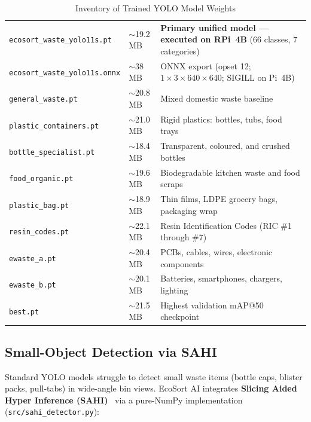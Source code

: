 \documentclass[12pt,a4paper]{article}
\begin{document}
\renewcommand{\arraystretch}{1.30}
\begin{table}[H]
\centering
\caption{Inventory of Trained YOLO Model Weights}
\label{tab:models}
\small
\begin{tabularx}{\linewidth}{@{} L{5.7cm} C{1.7cm} X @{}}
\toprule
{} &  &  \\
\midrule
{}
{\footnotesize\texttt{ecosort\_waste\_yolo11s.pt}}   & $\sim$19.2\,MB & \textbf{Primary unified model --- executed on RPi~4B} (66 classes, 7 categories) \\
{\footnotesize\texttt{ecosort\_waste\_yolo11s.onnx}} & $\sim$38\,MB   & ONNX export (opset 12; $1\times3\times640\times640$; SIGILL on Pi~4B) \\
\texttt{general\_waste.pt}          & $\sim$20.8\,MB & Mixed domestic waste baseline \\
\texttt{plastic\_containers.pt}     & $\sim$21.0\,MB & Rigid plastics: bottles, tubs, food trays \\
\texttt{bottle\_specialist.pt}      & $\sim$18.4\,MB & Transparent, coloured, and crushed bottles \\
\texttt{food\_organic.pt}           & $\sim$19.6\,MB & Biodegradable kitchen waste and food scraps \\
\texttt{plastic\_bag.pt}            & $\sim$18.9\,MB & Thin films, LDPE grocery bags, packaging wrap \\
\texttt{resin\_codes.pt}            & $\sim$22.1\,MB & Resin Identification Codes (RIC \#1 through \#7) \\
\texttt{ewaste\_a.pt}               & $\sim$20.4\,MB & PCBs, cables, wires, electronic components \\
\texttt{ewaste\_b.pt}               & $\sim$20.1\,MB & Batteries, smartphones, chargers, lighting \\
\texttt{best.pt}                    & $\sim$21.5\,MB & Highest validation mAP@50 checkpoint \\
\bottomrule
\end{tabularx}
\end{table}

\subsection{Small-Object Detection via SAHI}

Standard YOLO models struggle to detect small waste items (bottle caps, blister packs,
pull-tabs) in wide-angle bin views. EcoSort AI integrates
\textbf{Slicing Aided Hyper Inference (SAHI)}~\cite{akyon2022sahi} via a pure-NumPy
implementation (\texttt{src/sahi\_detector.py}):
\end{document}
